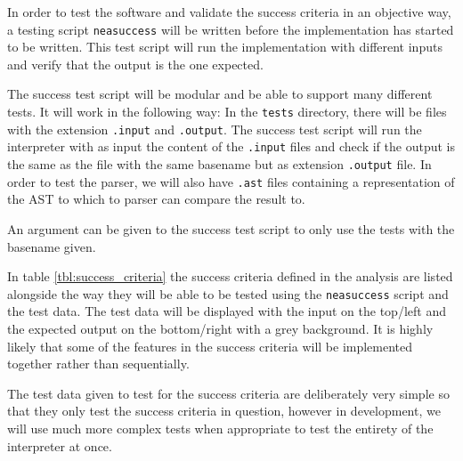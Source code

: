 \documentclass{article}
\begin{document}
In order to test the software and validate the success criteria in an objective
way, a testing script \texttt{neasuccess} will be written before the
implementation has started to be written. This test script will run the
implementation with different inputs and verify that the output is the one
expected.

The success test script will be modular and be able to support many different
tests. It will work in the following way: In the \texttt{tests} directory,
there will be files with the extension \texttt{.input} and \texttt{.output}.
The success test script will run the interpreter with as input the content of
the \texttt{.input} files and check if the output is the same as the file with
the same basename but as extension \texttt{.output} file. In order to test the
parser, we will also have \texttt{.ast} files containing a representation of
the AST to which to parser can compare the result to.

An argument can be given to the success test script to only use the tests with
the basename given.

In table \ref{tbl:success_criteria} the success criteria defined in the
analysis are listed alongside the way they will be able to be tested using the
\texttt{neasuccess} script and the test data. The test data will be displayed
with the input on the top/left and the expected output on the bottom/right with
a grey background. It is highly likely that some of the features in the success
criteria will be implemented together rather than sequentially.

The test data given to test for the success criteria are deliberately very
simple so that they only test the success criteria in question, however in
development, we will use much more complex tests when appropriate to test the
entirety of the interpreter at once.
\end{document}
